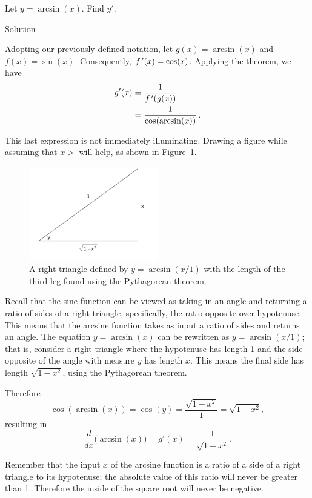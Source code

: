 \begin{example}\label{ex_deriv_arcsin}
Let $y = \arcsin(x)$. Find $y'$.


Solution 

Adopting our previously defined notation, let $g(x) = \arcsin(x)$ and $f(x) = \sin(x)$. Consequently, $f\,'(x) = \cos(x)$. Applying the theorem, we have 
\begin{align*}
			g'(x) &= \frac{1}{f\,'(g(x))} \\
						&= \frac{1}{\cos(\arcsin (x))} \,.
\end{align*}
			
This last expression is not immediately illuminating. Drawing a figure while assuming that $x>$ will help, as shown in Figure~\ref{fig_diff_11}. 

\begin{figure}[H]
	\begin{center}
			\includegraphics[width=0.5\textwidth]{fig_diff_11}
	\caption{A right triangle defined by $y=\arcsin(x/1)$ with the length of the third leg found using the Pythagorean theorem.}
	\label{fig_diff_11}
	\end{center}
\end{figure}

Recall that the sine function can be viewed as taking in an angle and returning a ratio of sides of a right triangle, specifically, the ratio opposite over hypotenuse. This means that the arcsine function takes as input a ratio of sides and returns an angle. The equation $y=\arcsin (x)$ can be rewritten as $y=\arcsin (x/1)$; that is, consider a right triangle where the hypotenuse has length 1 and the side opposite of the angle with measure $y$ has length $x$. This means the final side has length $\sqrt{1-x^2}$, using the Pythagorean theorem.


Therefore 
$$\cos (\arcsin(x)) = \cos(y) = \dfrac{\sqrt{1-x^2}}{1} = \sqrt{1-x^2},$$
resulting in $$\frac{d}{dx}\big(\arcsin(x)\big) = g'(x) = \frac{1}{\sqrt{1-x^2}}.$$

Remember that the input $x$ of the arcsine function is a ratio of a side of a right triangle to its hypotenuse; the absolute value of this ratio will never be greater than 1. Therefore the inside of the square root will never be negative.



\end{example}

